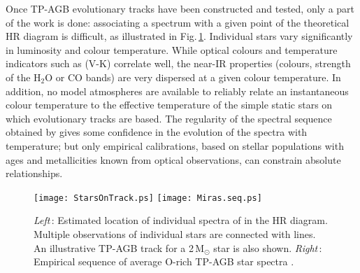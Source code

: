 \documentclass[runningheads]{svmult}
\begin{document}
Once TP-AGB evolutionary tracks have been constructed and tested,
only a part of the work is 
done: associating a spectrum with a given point of the theoretical
HR diagram is difficult, as illustrated in Fig.\,\ref{HR.fig}. 
Individual stars vary significantly in luminosity and colour
temperature. While optical colours and temperature indicators
such as (V-K) correlate well, the near-IR properties (colours,
strength of the H$_2$O or CO bands) are very dispersed at a
given colour temperature. In addition, no model atmospheres are
available to reliably relate an instantaneous colour temperature
to the effective temperature of the simple static stars on which
evolutionary tracks are based. The regularity of the spectral sequence
obtained by \cite{LM01} gives some confidence in the evolution of
the spectra with temperature; but only empirical calibrations, based
on stellar populations with ages and metallicities known from
optical observations, can constrain absolute relationships. 

\begin{figure}
\texttt{[image: StarsOnTrack.ps]}
\texttt{[image: Miras.seq.ps]}
\caption[]{{\em Left}\,: Estimated location of individual spectra of \cite{LW00}
in the HR diagram. Multiple observations of individual stars are
connected with lines. An illustrative TP-AGB track for a 2\,M$_{\odot}$ star
is also shown. {\em Right}\,: Empirical sequence of average O-rich TP-AGB 
star spectra \cite{LM01}.}
\label{HR.fig}
\end{figure}
\end{document}
